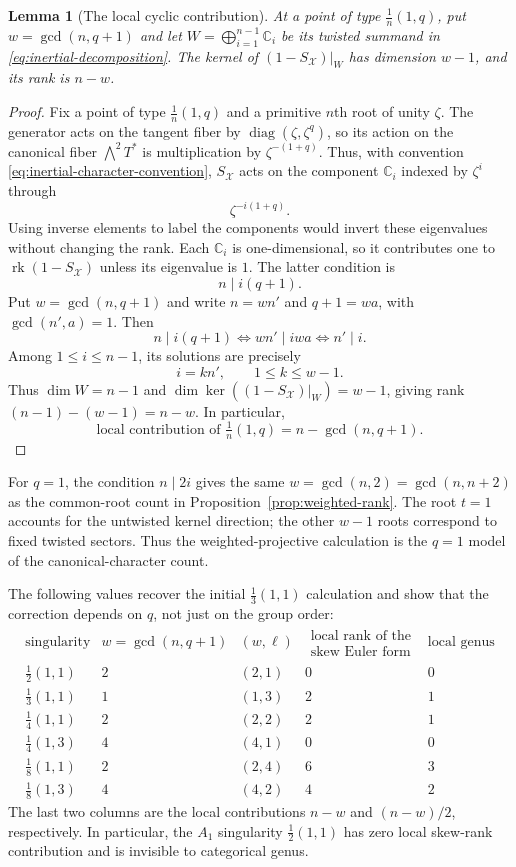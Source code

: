 \documentclass[11pt]{article}
\theoremstyle{plain}
\newtheorem{lemma}[theorem]{Lemma}
\theoremstyle{definition}
\theoremstyle{remark}
\newcommand{\cX}{\mathcal X}
\newcommand{\rk}{\operatorname{rk}}
\newcommand{\C}{\mathbb C}
\newcommand{\1}{\mathbf 1}
\begin{document}
\begin{lemma}[The local cyclic contribution]\label{lem:local-cyclic-rank}
At a point of type $\frac1n(1,q)$, put $w=\gcd(n,q+1)$ and let $W=\bigoplus_{i=1}^{n-1}\C_i$ be its twisted summand in \eqref{eq:inertial-decomposition}.  The kernel of $(1-S_{\cX})|_W$ has dimension $w-1$, and its rank is $n-w$.
\end{lemma}

\begin{proof}
Fix a point of type $\frac1n(1,q)$ and a primitive $n$th root of unity $\zeta$.  The generator acts on the tangent fiber by $\operatorname{diag}(\zeta,\zeta^q)$, so its action on the canonical fiber $\bigwedge^2T^*$ is multiplication by $\zeta^{-(1+q)}$.  Thus, with convention \eqref{eq:inertial-character-convention}, $S_{\cX}$ acts on the component $\C_i$ indexed by $\zeta^i$ through
\[
\zeta^{-i(1+q)}.
\]
Using inverse elements to label the components would invert these eigenvalues without changing the rank.  Each $\C_i$ is one-dimensional, so it contributes one to $\rk(1-S_{\cX})$ unless its eigenvalue is $1$.  The latter condition is
\[
n\mid i(q+1).
\]
Put $w=\gcd(n,q+1)$ and write $n=wn'$ and $q+1=wa$, with $\gcd(n',a)=1$.  Then
\[
n\mid i(q+1)\iff wn'\mid iwa\iff n'\mid i.
\]
Among $1\le i\le n-1$, its solutions are precisely
\[
i=kn',\qquad 1\le k\le w-1.
\]
Thus $\dim W=n-1$ and $\dim\ker((1-S_{\cX})|_W)=w-1$, giving rank $(n-1)-(w-1)=n-w$.  In particular,
\[
\boxed{\text{local contribution of }\tfrac1n(1,q)=n-\gcd(n,q+1).}
\]
\end{proof}

For $q=1$, the condition $n\mid2i$ gives the same $w=\gcd(n,2)=\gcd(n,n+2)$ as the common-root count in Proposition~\ref{prop:weighted-rank}.  The root $t=1$ accounts for the untwisted kernel direction; the other $w-1$ roots correspond to fixed twisted sectors.  Thus the weighted-projective calculation is the $q=1$ model of the canonical-character count.

The following values recover the initial $\frac13(1,1)$ calculation and show that the correction depends on $q$, not just on the group order:
\[
\begin{array}{c|c|c|c|c}
\text{singularity}&w=\gcd(n,q+1)&(w,\ell)&\substack{\text{local rank of the}\\\text{skew Euler form}}&\text{local genus}\\
\hline
\frac12(1,1)&2&(2,1)&0&0\\
\frac13(1,1)&1&(1,3)&2&1\\
\frac14(1,1)&2&(2,2)&2&1\\
\frac14(1,3)&4&(4,1)&0&0\\
\frac18(1,1)&2&(2,4)&6&3\\
\frac18(1,3)&4&(4,2)&4&2
\end{array}
\]
The last two columns are the local contributions $n-w$ and $(n-w)/2$, respectively.  In particular, the $A_1$ singularity $\frac12(1,1)$ has zero local skew-rank contribution and is invisible to categorical genus.
\end{document}
